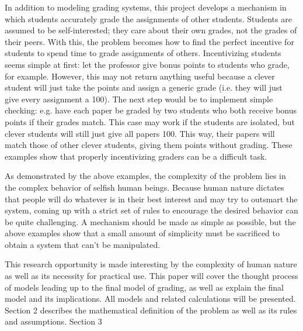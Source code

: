 \documentclass[12pt, Arial]{article}
\begin{document}
In addition to modeling grading systems, this project develops a mechanism in which students accurately grade the assignments of other students. Students are assumed to be self-interested; they care about their own grades, not the grades of their peers. With this, the problem becomes how to find the perfect incentive for students to spend time to grade assignments of others. Incentivizing students seems simple at first: let the professor give bonus points to students who grade, for example. However, this may not return anything useful because a clever student will just take the points and assign a generic grade (i.e. they will just give every assignment a 100). The next step would be to implement simple checking: e.g. have each paper be graded by two students who both receive bonus points if their grades match. This case may work if the students are isolated, but clever students will still just give all papers 100. This way, their papers will match those of other clever students, giving them points without grading. These examples show that properly incentivizing graders can be a difficult task.

As demonstrated by the above examples, the complexity of the problem lies in the complex behavior of selfish human beings. Because human nature dictates that people will do whatever is in their best interest and may try to outsmart the system, coming up with a strict set of rules to encourage the desired behavior can be quite challenging. A mechanism should be made as simple as possible, but the above examples show that a small amount of simplicity must be sacrificed to obtain a system that can't be manipulated.

This research opportunity is made interesting by the complexity of human nature as well as its necessity for practical use. This paper will cover the thought process of models leading up to the final model of grading, as well as explain the final model and its implications. All models and related calculations will be presented. Section 2 describes the mathematical definition of the problem as well as its rules and assumptions. Section 3
\end{document}
